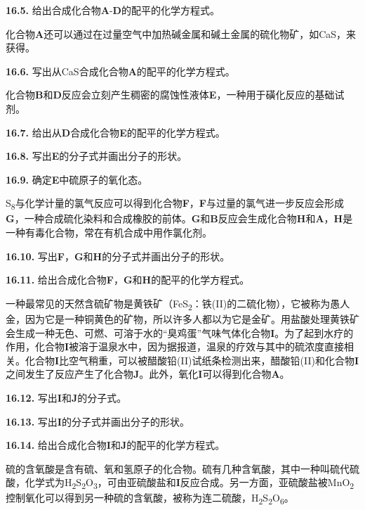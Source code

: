 \noindent\textbf{16.5.} 给出合成化合物\textbf{A}-\textbf{D}的配平的化学方程式。

化合物\textbf{A}还可以通过在过量空气中加热碱金属和碱土金属的硫化物矿，如CaS，来获得。

\noindent\textbf{16.6.} 写出从CaS合成化合物\textbf{A}的配平的化学方程式。

化合物\textbf{B}和\textbf{D}反应会立刻产生稠密的腐蚀性液体\textbf{E}，一种用于磺化反应的基础试剂。

\noindent\textbf{16.7.} 给出从\textbf{D}合成化合物\textbf{E}的配平的化学方程式。

\noindent\textbf{16.8.} 写出\textbf{E}的分子式并画出分子的形状。

\noindent\textbf{16.9.} 确定\textbf{E}中硫原子的氧化态。

S\textsubscript{8}与化学计量的氯气反应可以得到化合物\textbf{F}，\textbf{F}与过量的氯气进一步反应会形成\textbf{G}，一种合成硫化染料和合成橡胶的前体。\textbf{G}和\textbf{B}反应会生成化合物\textbf{H}和\textbf{A}，\textbf{H}是一种有毒化合物，常在有机合成中用作氯化剂。

\noindent\textbf{16.10.}
写出\textbf{F}，\textbf{G}和\textbf{H}的分子式并画出分子的形状。

\noindent\textbf{16.11.}
给出合成化合物\textbf{F}，\textbf{G}和\textbf{H}的配平的化学方程式。

一种最常见的天然含硫矿物是黄铁矿（FeS\textsubscript{2}：铁(II)的二硫化物），它被称为愚人金，因为它是一种铜黄色的矿物，所以许多人都以为它是金矿。用盐酸处理黄铁矿会生成一种无色、可燃、可溶于水的``臭鸡蛋''气味气体化合物\textbf{I}。为了起到水疗的作用，化合物\textbf{I}被溶于温泉水中，因为据报道，温泉的疗效与其中的硫浓度直接相关。化合物\textbf{I}比空气稍重，可以被醋酸铅(II)试纸条检测出来，醋酸铅(II)和化合物\textbf{I}之间发生了反应产生了化合物\textbf{J}。此外，氧化\textbf{I}可以得到化合物\textbf{A}。

\noindent\textbf{16.12.} 写出\textbf{I}和\textbf{J}的分子式。

\noindent\textbf{16.13.} 写出\textbf{I}的分子式并画出分子的形状。

\noindent\textbf{16.14.} 给出合成化合物\textbf{I}和\textbf{J}的配平的化学方程式。

硫的含氧酸是含有硫、氧和氢原子的化合物。硫有几种含氧酸，其中一种叫硫代硫酸，化学式为H\textsubscript{2}S\textsubscript{2}O\textsubscript{3}，可由亚硫酸盐和\textbf{I}反应合成。另一方面，亚硫酸盐被MnO\textsubscript{2}控制氧化可以得到另一种硫的含氧酸，被称为连二硫酸，H\textsubscript{2}S\textsubscript{2}O\textsubscript{6}。

